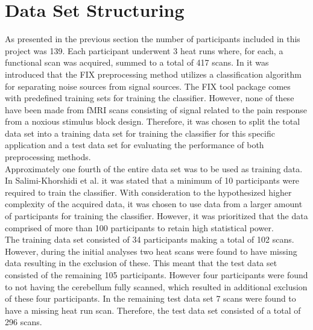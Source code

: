 \section{Data Set Structuring}

As presented in the previous section the number of participants included in this project was 139. Each participant underwent 3 heat runs where, for each, a functional scan was acquired, summed to a total of 417 scans. In  it was introduced that the FIX preprocessing method utilizes a classification algorithm for separating noise sources from signal sources. The FIX tool package comes with predefined training sets for training the classifier. However, none of these have been made from fMRI scans consisting of signal related to the pain response from a noxious stimulus block design. Therefore, it was chosen to split the total data set into a training data set for training the classifier for this specific application and a test data set for evaluating the performance of both preprocessing methods. \\
Approximately one fourth of the entire data set was to be used as training data. In Salimi-Khorshidi et al. \cite{Salimi-Khorshidi2014} it was stated that a minimum of 10 participants were required to train the classifier. With consideration to the hypothesized higher complexity of the acquired data, it was chosen to use data from a larger amount of participants for training the classifier. However, it was prioritized that the data comprised of more than 100 participants to retain high statistical power.\\
The training data set consisted of 34 participants making a total of 102 scans. However, during the initial analyses two heat scans were found to have missing data resulting in the exclusion of these. This meant that the test data set consisted of the remaining 105 participants. However four participants were found to not having the cerebellum fully scanned, which resulted in additional exclusion of these four participants. In the remaining test data set 7 scans were found to have a missing heat run scan.  Therefore, the test data set consisted of a total of 296 scans.  \\

%
